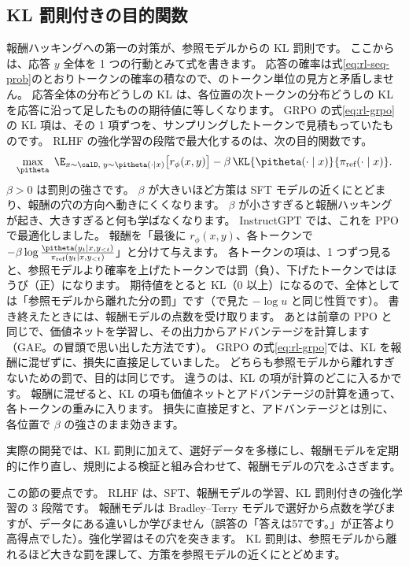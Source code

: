 \subsection{KL 罰則付きの目的関数}

報酬ハッキングへの第一の対策が、参照モデルからの KL 罰則です。
ここからは、応答 $y$ 全体を 1 つの行動とみて式を書きます。
応答の確率は式\eqref{eq:rl-seq-prob}のとおりトークンの確率の積なので、のトークン単位の見方と矛盾しません。
応答全体の分布どうしの KL は、各位置の次トークンの分布どうしの KL を応答に沿って足したものの期待値に等しくなります。
GRPO の式\eqref{eq:rl-grpo}の KL 項は、その 1 項ずつを、サンプリングしたトークンで見積もっていたものです。
RLHF の強化学習の段階で最大化するのは、次の目的関数です\cite{ouyang2022training}。
\begin{equation}
\max_{\pitheta}\;\E_{x\sim\calD,\;y\sim\pitheta(\cdot\mid x)}\bigl[r_\phi(x,y)\bigr]
-\beta\,\KL{\pitheta(\cdot\mid x)}{\pi_{\text{ref}}(\cdot\mid x)}.
\label{eq:rl-kl-objective}
\end{equation}
$\beta>0$ は罰則の強さです。
$\beta$ が大きいほど方策は SFT モデルの近くにとどまり、報酬の穴の方向へ動きにくくなります。
$\beta$ が小さすぎると報酬ハッキングが起き、大きすぎると何も学ばなくなります。
InstructGPT では、これを PPO で最適化しました。
報酬を「最後に $r_\phi(x,y)$、各トークンで $-\beta\log\frac{\pitheta(y_t\mid x,y_{<t})}{\pi_{\text{ref}}(y_t\mid x,y_{<t})}$」と分けて与えます。
各トークンの項は、1 つずつ見ると、参照モデルより確率を上げたトークンでは罰（負）、下げたトークンではほうび（正）になります。
期待値をとると KL（0 以上）になるので、全体としては「参照モデルから離れた分の罰」です（で見た $-\log u$ と同じ性質です）。
書き終えたときには、報酬モデルの点数を受け取ります。
あとは前章の PPO と同じで、価値ネットを学習し、その出力からアドバンテージを計算します（GAE。の冒頭で思い出した方法です）。
GRPO の式\eqref{eq:rl-grpo}では、KL を報酬に混ぜずに、損失に直接足していました。
どちらも参照モデルから離れすぎないための罰で、目的は同じです。
違うのは、KL の項が計算のどこに入るかです。
報酬に混ぜると、KL の項も価値ネットとアドバンテージの計算を通って、各トークンの重みに入ります。
損失に直接足すと、アドバンテージとは別に、各位置で $\beta$ の強さのまま効きます。

実際の開発では、KL 罰則に加えて、選好データを多様にし、報酬モデルを定期的に作り直し、規則による検証と組み合わせて、報酬モデルの穴をふさぎます。

この節の要点です。
RLHF は、SFT、報酬モデルの学習、KL 罰則付きの強化学習の 3 段階です。
報酬モデルは Bradley--Terry モデルで選好から点数を学びますが、データにある違いしか学びません（誤答の「答えは57です。」が正答より高得点でした）。強化学習はその穴を突きます。
KL 罰則は、参照モデルから離れるほど大きな罰を課して、方策を参照モデルの近くにとどめます。

